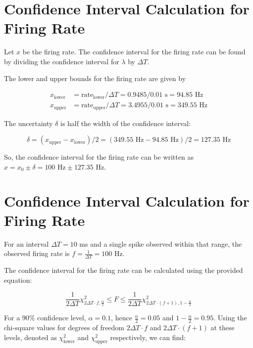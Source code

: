 \section*{Confidence Interval Calculation for Firing Rate}

Let $x$ be the firing rate. The confidence interval for the firing rate can be found by dividing the confidence interval for $\lambda$ by $\Delta T$.

The lower and upper bounds for the firing rate are given by

\begin{align*}
x_{\text{lower}} &= \text{rate}_{\text{lower}} / \Delta T = 0.9485 / 0.01 \text{ s} = 94.85 \text{ Hz} \\
x_{\text{upper}} &= \text{rate}_{\text{upper}} / \Delta T = 3.4955 / 0.01 \text{ s} = 349.55 \text{ Hz}
\end{align*}

The uncertainty $\delta$ is half the width of the confidence interval:

\begin{equation*}
\delta = (x_{\text{upper}} - x_{\text{lower}}) / 2 = (349.55 \text{ Hz} - 94.85 \text{ Hz}) / 2 = 127.35 \text{ Hz}
\end{equation*}

So, the confidence interval for the firing rate can be written as $x = x_0 \pm \delta = 100 \text{ Hz} \pm 127.35 \text{ Hz}$.


\section*{Confidence Interval Calculation for Firing Rate}

For an interval $\Delta T = 10$ ms and a single spike observed within that range, the observed firing rate is $f = \frac{1}{\Delta T} = 100$ Hz. 

The confidence interval for the firing rate can be calculated using the provided equation:

\begin{equation}
\frac{1}{2\Delta T} \chi^{2}_{2\Delta T \cdot f, \frac{\alpha}{2}} \leq F \leq \frac{1}{2\Delta T} \chi^{2}_{2\Delta T \cdot (f+1), 1-\frac{\alpha}{2}}
\end{equation}

For a 90\% confidence level, $\alpha = 0.1$, hence $\frac{\alpha}{2} = 0.05$ and $1-\frac{\alpha}{2} = 0.95$. Using the chi-square values for degrees of freedom $2\Delta T \cdot f$ and $2\Delta T \cdot (f+1)$ at these levels, denoted as $\chi^{2}_{\text{lower}}$ and $\chi^{2}_{\text{upper}}$ respectively, we can find:


